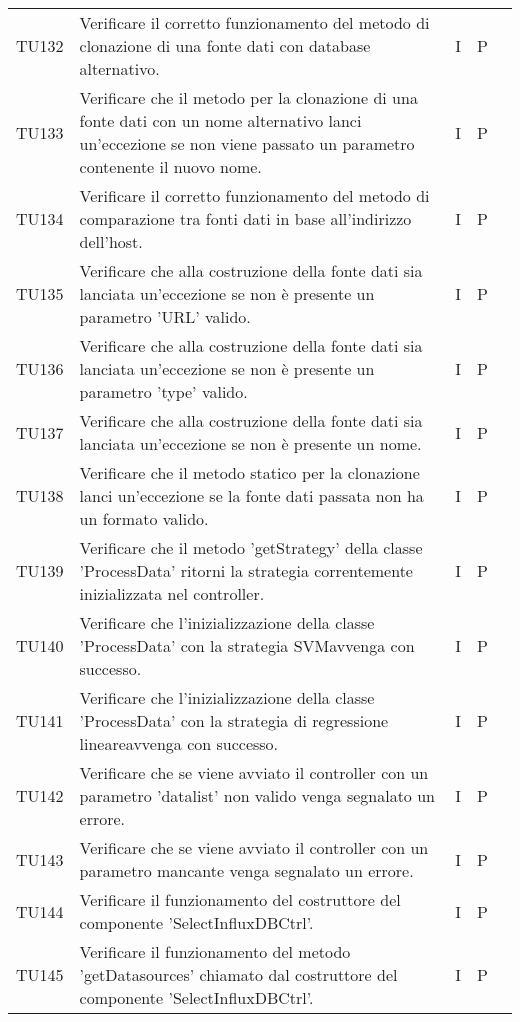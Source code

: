 \begin{longtable} {
		>{}p{15mm} 
		>{}p{79.5mm}
		>{}p{15mm} 
		>{}p{15mm}
		>{}p{0mm}}
	TU132		& Verificare il corretto funzionamento del metodo di clonazione di una fonte dati con database alternativo. & I & P &\TBstrut \\ [2mm]
	TU133		& Verificare che il metodo per la clonazione di una fonte dati con un nome alternativo lanci un'eccezione se non viene passato un parametro contenente il nuovo nome.& I & P &\TBstrut \\ [2mm]
	TU134		& Verificare il corretto funzionamento del metodo di comparazione tra fonti dati in base all'indirizzo dell'host. & I & P &\TBstrut \\ [2mm]
	TU135		& Verificare che alla costruzione della fonte dati sia lanciata un'eccezione se non è presente un parametro 'URL' valido.& I & P &\TBstrut \\ [2mm]
	TU136		& Verificare che alla costruzione della fonte dati sia lanciata un'eccezione se non è presente un parametro 'type' valido.& I & P &\TBstrut \\ [2mm]
	TU137		& Verificare che alla costruzione della fonte dati sia lanciata un'eccezione se non è presente un nome.& I & P &\TBstrut \\ [2mm]
	TU138		& Verificare che il metodo statico per la clonazione lanci un'eccezione se la fonte dati passata non ha un formato valido. & I & P &\TBstrut \\ [2mm]
	TU139		& Verificare che il metodo 'getStrategy' della classe 'ProcessData' ritorni la strategia correntemente inizializzata nel controller. & I & P &\TBstrut \\ [2mm]
	TU140		& Verificare che l'inizializzazione della classe 'ProcessData' con la strategia SVM\glosp avvenga con successo. & I & P &\TBstrut \\ [2mm]
	TU141		& Verificare che l'inizializzazione della classe 'ProcessData' con la strategia di regressione lineare\glosp avvenga con successo. & I & P &\TBstrut \\ [2mm]
	TU142		& Verificare che se viene avviato il controller con un parametro 'datalist' non valido venga segnalato un errore. & I & P &\TBstrut \\ [2mm]
	TU143		& Verificare che se viene avviato il controller con un parametro mancante venga segnalato un errore. & I & P &\TBstrut \\ [2mm]
	TU144		& Verificare il funzionamento del costruttore del componente 'SelectInfluxDBCtrl'.& I & P &\TBstrut \\ [2mm]
	TU145		& Verificare il funzionamento del metodo 'getDatasources' chiamato dal costruttore del componente 'SelectInfluxDBCtrl'.& I & P &\TBstrut \\ [2mm]

\end{longtable}
